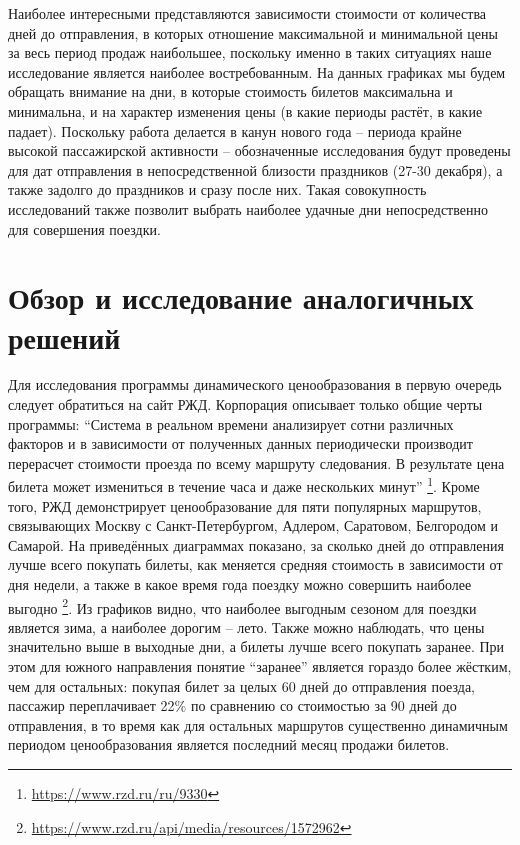\documentclass[conference]{IEEEtran}
\begin{document}
Наиболее интересными представляются зависимости стоимости от количества дней до отправления, в которых отношение максимальной и минимальной цены за весь период продаж наибольшее, поскольку именно в таких ситуациях наше исследование является наиболее востребованным. На данных графиках мы будем обращать внимание на дни, в которые стоимость билетов максимальна и минимальна, и на характер изменения цены (в какие периоды растёт, в какие падает). Поскольку работа делается в канун нового года -- периода крайне высокой пассажирской активности -- обозначенные исследования будут проведены для дат отправления в непосредственной близости праздников (27-30 декабря), а также задолго до праздников и сразу после них. Такая совокупность исследований также позволит выбрать наиболее удачные дни непосредственно для совершения поездки.

\section{Обзор и исследование аналогичных решений}

Для исследования программы динамического ценообразования в первую очередь следует обратиться на сайт РЖД. Корпорация описывает только общие черты программы: ``Система в реальном времени анализирует сотни различных факторов и в зависимости от полученных данных периодически производит перерасчет стоимости проезда по всему маршруту следования. В результате цена билета может измениться в течение часа и даже нескольких минут'' \footnote{\href{https://www.rzd.ru/ru/9330}{https://www.rzd.ru/ru/9330}}.
Кроме того, РЖД демонстрирует ценообразование для пяти популярных маршрутов, связывающих Москву с Санкт-Петербургом, Адлером, Саратовом, Белгородом и Самарой. На приведённых диаграммах показано, за сколько дней до отправления лучше всего покупать билеты, как меняется средняя стоимость в зависимости от дня недели, а также в какое время года поездку можно совершить наиболее выгодно \footnote{\href{https://www.rzd.ru/api/media/resources/1572962}{https://www.rzd.ru/api/media/resources/1572962}}.
Из графиков видно, что наиболее выгодным сезоном для поездки является зима, а наиболее дорогим -- лето. Также можно наблюдать, что цены значительно выше в выходные дни, а билеты лучше всего покупать заранее. При этом для южного направления понятие ``заранее'' является гораздо более жёстким, чем для остальных: покупая билет за целых 60 дней до отправления поезда, пассажир переплачивает 22\% по сравнению со стоимостью за 90 дней до отправления, в то время как для остальных маршрутов существенно динамичным периодом ценообразования является последний месяц продажи билетов.
\end{document}
